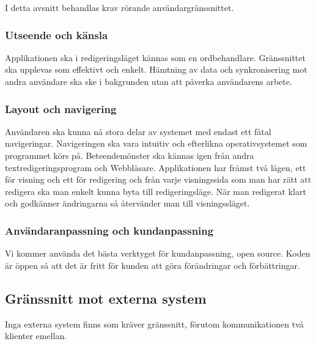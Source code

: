 I detta avsnitt behandlas krav rörande användargränssnittet.

\subsubsection{Utseende och känsla}
Applikationen ska i redigeringsläget kännas som en ordbehandlare. Gränssnittet ska upplevas som effektivt och enkelt. Hämtning av data och synkronisering mot andra användare ska ske i bakgrunden utan att påverka användarens arbete.

\subsubsection{Layout och navigering}
Användaren ska kunna nå stora delar av systemet med endast ett fåtal navigeringar. Navigeringen ska vara intuitiv och efterlikna operativsystemet som programmet körs på. Beteendemönster ska kännas igen från andra textredigeringsprogram och Webbläsare. Applikationen har främst två lägen, ett för visning och ett för redigering och från varje visningssida som man har rätt att redigera ska man enkelt kunna byta till redigeringsläge. När man redigerat klart och godkänner ändringarna så återvänder man till visningssläget.


\subsubsection{Användaranpassning och kundanpassning}
Vi kommer använda det bästa verktyget för kundanpassning, open source. Koden är öppen så att det är fritt för kunden att göra förändringar och förbättringar.

\subsection{Gränssnitt mot externa system}
Inga externa system finns som kräver gränssnitt, förutom kommunikationen två klienter emellan.

